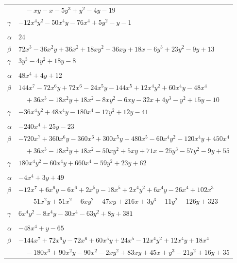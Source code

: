 \documentclass[11pt]{article}
\begin{document}
\begin{longtable}{@{}ll@{}}
 & $\quad -xy-x-5y^{3}+y^{2}-4y-19$\\
$\gamma$ & $-12x^{4}y^{2}-50x^{4}y-76x^{4}+5y^{2}-y-1$\\
\addlinespace[3pt]
\multicolumn{2}{@{}l}{$\{i,j\}=\{8,16\}$, $k_{ij}=3^{2}\cdot 5$}\\
$\alpha$ & $24$\\
$\beta$ & $72x^{3}-36x^{2}y+36x^{2}+18xy^{2}-36xy+18x-6y^{3}+23y^{2}-9y+13$\\
$\gamma$ & $3y^{3}-4y^{2}+18y-8$\\
\addlinespace[3pt]
\multicolumn{2}{@{}l}{$\{i,j\}=\{8,26\}$, $k_{ij}=2$}\\
$\alpha$ & $48x^{4}+4y+12$\\
$\beta$ & $144x^{7}-72x^{6}y+72x^{6}-24x^{5}y-144x^{5}+12x^{4}y^{2}+60x^{4}y-48x^{4}$\\
 & $\quad +36x^{3}-18x^{2}y+18x^{2}-8xy^{2}-6xy-32x+4y^{3}-y^{2}+15y-10$\\
$\gamma$ & $-36x^{4}y^{2}+48x^{4}y-180x^{4}-17y^{2}+12y-41$\\
\addlinespace[3pt]
\multicolumn{2}{@{}l}{$\{i,j\}=\{8,38\}$, $k_{ij}=2^{5}$}\\
$\alpha$ & $-240x^{4}+25y-23$\\
$\beta$ & $-720x^{7}+360x^{6}y-360x^{6}+300x^{5}y+480x^{5}-60x^{4}y^{2}-120x^{4}y+450x^{4}$\\
 & $\quad +36x^{3}-18x^{2}y+18x^{2}-50xy^{2}+5xy+71x+25y^{3}-57y^{2}-9y+55$\\
$\gamma$ & $180x^{4}y^{2}-60x^{4}y+660x^{4}-59y^{2}+23y+62$\\
\addlinespace[3pt]
\multicolumn{2}{@{}l}{$\{i,j\}=\{8,50\}$, $k_{ij}=2\cdot 3^{4}\cdot 7$}\\
$\alpha$ & $-4x^{4}+3y+49$\\
$\beta$ & $-12x^{7}+6x^{6}y-6x^{6}+2x^{5}y-18x^{5}+2x^{4}y^{2}+6x^{4}y-26x^{4}+102x^{3}$\\
 & $\quad -51x^{2}y+51x^{2}-6xy^{2}-47xy+216x+3y^{3}-11y^{2}-126y+323$\\
$\gamma$ & $6x^{4}y^{2}-8x^{4}y-30x^{4}-63y^{2}+8y+381$\\
\addlinespace[3pt]
\multicolumn{2}{@{}l}{$\{i,j\}=\{8,57\}$, $k_{ij}=2^{2}\cdot 3\cdot 5$}\\
$\alpha$ & $-48x^{4}+y-65$\\
$\beta$ & $-144x^{7}+72x^{6}y-72x^{6}+60x^{5}y+24x^{5}-12x^{4}y^{2}+12x^{4}y+18x^{4}$\\
 & $\quad -180x^{3}+90x^{2}y-90x^{2}-2xy^{2}+83xy+45x+y^{3}-21y^{2}+16y+35$\\

\end{longtable}
\end{document}
